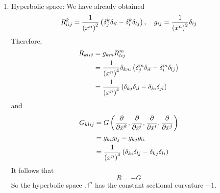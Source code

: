 \begin{enumerate}[label=\arabic{*}.]
\begin{exam}
\begin{enumerate}[label=(\arabic{*})]
			\item Hyperbolic space: We have already obtained
			\begin{equation*}
				R_{l i j}^k = \frac{1}{\left(x^n\right)^2}\left(\delta^k_j\delta_{il}-\delta^k_i\delta_{lj}\right),\quad g_{ij} = \frac{1}{\left(x^n\right)^2}\delta_{ij}
			\end{equation*}
			Therefore,
			\begin{equation*}
				\begin{aligned}
					R_{klij} &= g_{km}R^m_{lij} \\
					&= \frac{1}{\left(x^n\right)^4}\delta_{km}\left(\delta^m_j\delta_{il}-\delta^m_i\delta_{lj}\right) \\
					&= \frac{1}{\left(x^n\right)^4}\left(\delta_{kj}\delta_{il}-\delta_{ki}\delta_{jl}\right)
				\end{aligned}
			\end{equation*}
			and
			\begin{equation*}
				\begin{aligned}
					G_{klij} &= G\left(\frac{\partial}{\partial x^k},\frac{\partial}{\partial x^l},\frac{\partial}{\partial x^i},\frac{\partial}{\partial x^j}\right) \\
					&= g_{ki}g_{lj} -g_{kj}g_{li} \\
					&= \frac{1}{\left(x^n\right)^4}\left(\delta_{ki}\delta_{lj} - \delta_{kj}\delta_{li}\right)
				\end{aligned}
			\end{equation*}
			It follows that
			\begin{equation*}
				R = -G
			\end{equation*}
			So the hyperbolic space $\mathbb{H}^n$ has the constant sectional curvature $-1$.
		\end{enumerate}
	\end{exam}


\end{enumerate}
